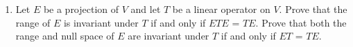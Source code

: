 \renewcommand{\theequation}{\theenumi}
\renewcommand{\thefigure}{\theenumi}
\begin{enumerate}[label=\thesubsection.\arabic*.,ref=\thesubsection.\theenumi]

\item Let $E$ be a projection of $V$ and let $T$ be a linear operator on $V$. Prove that the range of $E$ is invariant under $T$ if and only if $ETE$ = $TE$. Prove that both the range and null space of $E$ are invariant under $T$ if and only if $ET$ = $TE$. 
%
\\
\solution

\end{enumerate}
